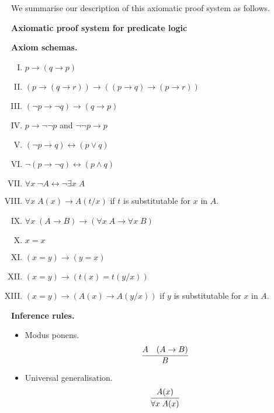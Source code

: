 We summarise our description of this axiomatic proof system as follows.

\vspace{1em}
\begin{mdframed}[linewidth=1pt]
\begin{center}
    \large\textbf{Axiomatic proof system for predicate logic}
\end{center}

\textbf{Axiom schemas.}
%
\begin{enumerate}[I.]
    \item \(p \rightarrow (q \rightarrow p)\)
    
    \item \((p \rightarrow (q \rightarrow r)) \rightarrow ((p \rightarrow q) \rightarrow (p \rightarrow r))\)
    
    \item \((\neg p \rightarrow \neg q) \rightarrow (q \rightarrow p)\)

    \item \(p \rightarrow \neg\neg p\) and \(\neg\neg p \rightarrow p\)
    
    \item \((\neg p \rightarrow q) \leftrightarrow (p \lor q)\)
    
    \item \(\neg(p \rightarrow \neg q) \leftrightarrow (p \land q)\)
    
    \item \(\forall x\; \neg A \leftrightarrow \neg\exists x\; A\)
    
    \item \(\forall x\; A(x) \rightarrow A(t/x)\) \;\; if \(t\) is substitutable for \(x\) in \(A\).
    
    \item \(\forall x\; (A \rightarrow B) \rightarrow (\forall x\; A \rightarrow \forall x\; B)\)

    \item \(x = x\)
    
    \item \((x = y) \rightarrow (y = x)\)
    
    \item \((x = y) \rightarrow (t(x) = t(y/x))\)

    \item \((x = y) \rightarrow (A(x) \rightarrow A(y/x))\)\;\; if \(y\) is substitutable for \(x\) in \(A\).
\end{enumerate}

\vspace{1em}
\textbf{Inference rules.}

\begin{itemize}
    \item Modus ponens.
    \[
    \infer{B}{
        A
        &
        (A\rightarrow B)
    }
    \]

    \item Universal generalisation.
    \[\infer{\forall x\; A(x)}{A(x)}\]
\end{itemize}
\end{mdframed}
\vspace{1em}

